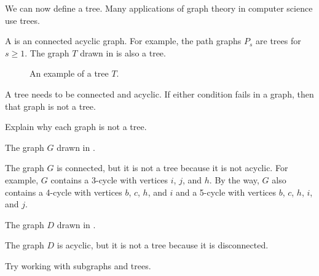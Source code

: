 We can now define a tree.  Many applications of graph theory in computer science use trees.

\begin{defn}[Tree]
\label{defn_tree}
    A  is an connected acyclic graph.  For example, the path graphs $P_s$ are trees for $s \ge 1$.  The graph $T$ drawn in  is also a tree.

    \begin{figure}[hbtp]
        \centering
        
        \caption{An example of a tree $T$.}
        \label{fig_tree_defn}
    \end{figure}
\end{defn}

A tree needs to be connected and acyclic.  If either condition fails in a graph, then that graph is not a tree.

\begin{exam}
\label{exam_not_a_tree}
    Explain why each graph is not a tree.
        \begin{apart}
            \item The graph $G$ drawn in .
                \begin{soln}
                    The graph $G$ is connected, but it is not a tree because it is not acyclic.  For example, $G$ contains a 3-cycle with vertices $i$, $j$, and $h$.  By the way, $G$ also contains a 4-cycle with vertices $b$, $c$, $h$, and $i$ and a 5-cycle with vertices $b$, $c$, $h$, $i$, and $j$.
                \end{soln}
            \item The graph $D$ drawn in .
                \begin{soln}
                    The graph $D$ is acyclic, but it is not a tree because it is disconnected.  
                \end{soln}
        \end{apart}
\end{exam}

Try working with subgraphs and trees.

